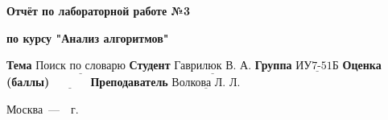 \begin{titlepage}
\begin{center}
    \Large\textbf{Отчёт по лабораторной работе №3}  
    
    \Large\textbf{по курсу "Анализ алгоритмов"}
\end{center}
\text{}\newline

\noindent\textbf{Тема} $\underline{\text{Поиск по словарю}}$\newline\newline\newline
\noindent\textbf{Студент} $\underline{\text{Гаврилюк В. А.}}$\newline\newline
\noindent\textbf{Группа} $\underline{\text{ИУ7-51Б}}$\newline\newline
\noindent\textbf{Оценка (баллы)} $\underline{\text{~~~~~~~~~}}$\newline\newline
\noindent\textbf{Преподаватель} $\underline{\text{Волкова Л. Л.}}$\newline

\begin{center}
    \vfill
    Москва~---~\the\year~г.
\end{center}
\restoregeometry
\end{titlepage}

\setlength{\tabcolsep}{3pt}
\newpage
\setcounter{page}{2}